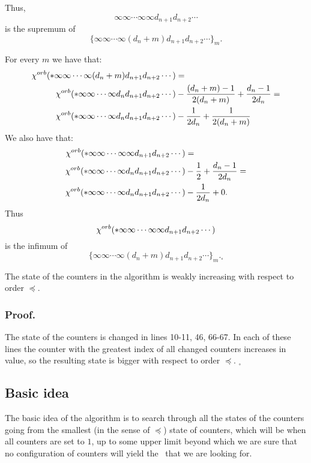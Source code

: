 Thus, 
\begin{equation}
\infty\infty\cdots\infty \infty d_{n+1} d_{n+2}\cdots
\end{equation} 
is the supremum of 
\begin{equation}
\{\infty\infty\cdots\infty (d_n+m) d_{n+1} d_{n+2}\cdots\}_m.
\end{equation}

For every $m$ we have that: 
\begin{align}
{\chi^{orb}(*\infty\infty\cdots\infty (d_n+m) d_{n+1} d_{n+2}\cdots)} &= \\ 
{\chi^{orb}(*\infty\infty\cdots\infty d_n d_{n+1} d_{n+2}\cdots)} 
&- \frac{(d_n+m)-1}{2(d_n+m)} + \frac{d_n-1}{2d_n} = \notag \\ 
{\chi^{orb}(*\infty\infty\cdots\infty d_n d_{n+1} d_{n+2}\cdots)} &- 
\frac{1}{2d_n} + \frac{1}{2(d_n+m)}
\end{align}
We also have that:
\begin{align}
{\chi^{orb}(*\infty\infty\cdots\infty \infty d_{n+1} d_{n+2}\cdots)} &= \\
{\chi^{orb}(*\infty\infty\cdots\infty d_n d_{n+1} d_{n+2}\cdots)} 
&- \frac{1}{2} + \frac{d_n-1}{2d_n} = \notag \\ 
{\chi^{orb}(*\infty\infty\cdots\infty d_n d_{n+1} d_{n+2}\cdots)} &- \frac{1}{2d_n} + 0.
\end{align}
Thus 
\begin{equation}
{\chi^{orb}(*\infty\infty\cdots\infty \infty d_{n+1} d_{n+2}\cdots)}
\end{equation} 
is the infimum of 
\begin{equation}
\{\infty\infty\cdots\infty (d_n+m) d_{n+1} d_{n+2}\cdots\}_m. _\square
\end{equation}
\begin{lemma}
The state of the counters in the algorithm is weakly increasing with respect to order $\preceq$. 
\end{lemma}
\subsubsection{Proof.}
The state of the counters is changed in lines 10-11, 46, 66-67. In each of these lines 
the counter with the greatest index of all changed counters increases in value, so 
the resulting state is bigger with respect to order $\preceq$. $_\square$

\subsection{Basic idea}\label{basic idea}
The basic idea of the algorithm is to search through all the states of the counters going 
from the smallest (in the sense of $\preceq$) state of counters, which will be when all counters 
are set to $1$, up to some upper limit beyond which we are sure that no configuration of 
counters will yield the \Eoc\ that we are looking for. 

